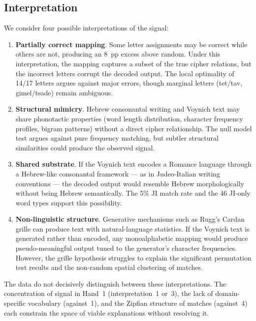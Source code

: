 \documentclass[11pt,a4paper]{article}
\begin{document}
\subsection{Interpretation}

We consider four possible interpretations of the signal:

\begin{enumerate}
\item \textbf{Partially correct mapping}. Some letter assignments may be
correct while others are not, producing an 8~pp excess above random. Under
this interpretation, the mapping captures a subset of the true cipher
relations, but the incorrect letters corrupt the decoded output. The local
optimality of 14/17 letters argues against major errors, though marginal
letters (tet/tav, gimel/tsade) remain ambiguous.

\item \textbf{Structural mimicry}. Hebrew consonantal writing and Voynich
text may share phonotactic properties (word length distribution, character
frequency profiles, bigram patterns) without a direct cipher relationship.
The null model test argues against pure frequency matching, but subtler
structural similarities could produce the observed signal.

\item \textbf{Shared substrate}. If the Voynich text encodes a Romance
language through a Hebrew-like consonantal framework --- as in Judeo-Italian
writing conventions --- the decoded output would resemble Hebrew
morphologically without being Hebrew semantically. The 5\% JI match rate
and the 46 JI-only word types support this possibility.

\item \textbf{Non-linguistic structure}. Generative mechanisms such as
Rugg's Cardan grille \citep{Rugg2004} can produce text with natural-language
statistics. If the Voynich text is generated rather than encoded, any
monoalphabetic mapping would produce pseudo-meaningful output tuned to the
generator's character frequencies. However, the grille hypothesis struggles
to explain the significant permutation test results and the
non-random spatial clustering of matches.
\end{enumerate}

The data do not decisively distinguish between these interpretations. The
concentration of signal in Hand~1 (interpretation~1 or~3), the lack of
domain-specific vocabulary (against~1), and the Zipfian structure of matches
(against~4) each constrain the space of viable explanations without resolving
it.
\end{document}
